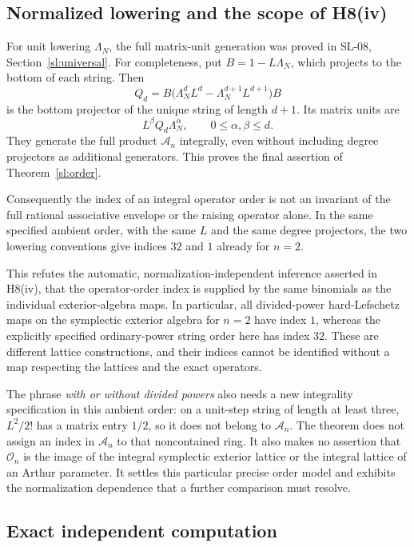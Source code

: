\documentclass[11pt,a4paper]{article}
\theoremstyle{remark}
\begin{document}
\subsection{Normalized lowering and the scope of H8(iv)}

For unit lowering \(\Lambda_N\), the full matrix-unit
generation was proved in SL-08, Section~\ref{sl:universal}.
For completeness, put \(B=1-L\Lambda_N\), which projects
to the bottom of each string.  Then
\[
Q_d
=B\bigl(\Lambda_N^dL^d-\Lambda_N^{d+1}L^{d+1}\bigr)B
\]
is the bottom projector of the unique string of length
\(d+1\).  Its matrix units are
\[
L^\beta Q_d\Lambda_N^\alpha,\qquad
0\le\alpha,\beta\le d.
\]
They generate the full product \(\mathcal A_n\) integrally,
even without including degree projectors as additional
generators.  This proves the final assertion of
Theorem~\ref{sl:order}.

Consequently the index of an integral operator order is
not an invariant of the full rational associative envelope
or the raising operator alone.  In the same specified
ambient order, with the same \(L\) and the same degree
projectors, the two lowering conventions give indices
\(32\) and \(1\) already for \(n=2\).

This refutes the automatic, normalization-independent
inference asserted in H8(iv), that the operator-order
index is supplied by the same binomials as the individual
exterior-algebra maps.  In particular, all divided-power
hard-Lefschetz maps on the symplectic exterior algebra for
\(n=2\) have index \(1\), whereas the explicitly specified
ordinary-power string order here has index \(32\).
These are different lattice constructions, and their
indices cannot be identified without a map respecting
the lattices and the exact operators.

The phrase \emph{with or without divided powers} also needs
a new integrality specification in this ambient order:
on a unit-step string of length at least three,
\(L^2/2!\) has a matrix entry \(1/2\), so it does not
belong to \(\mathcal A_n\).  The theorem does not assign
an index in \(\mathcal A_n\) to that noncontained ring.
It also makes no assertion that \(\mathcal O_n\) is the
image of the integral symplectic exterior lattice or the
integral lattice of an Arthur parameter.  It settles this
particular precise order model and exhibits the
normalization dependence that a further comparison must
resolve.

\subsection{Exact independent computation}
\end{document}
